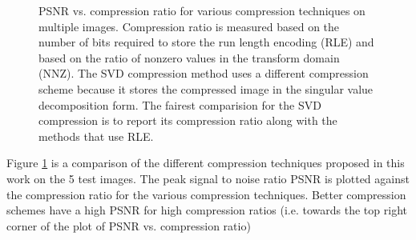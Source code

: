 \documentclass[conference]{IEEEtran}
\begin{document}
\begin{figure}
    \par
    \quad
    \caption{PSNR vs. compression ratio for various compression techniques on multiple images. Compression ratio is measured based on the number of bits required to store the run length encoding (RLE) and based on the ratio of nonzero values in the transform domain (NNZ). The SVD compression method uses a different compression scheme because it stores the compressed image in the singular value decomposition form. The fairest comparision for the SVD compression is to report its compression ratio along with the methods that use RLE.}
    \label{fig:cr_psnr_method_comparison}
\end{figure}

Figure \ref{fig:cr_psnr_method_comparison} is a comparison of the different compression techniques proposed in this work on the 5 test images.
The peak signal to noise ratio PSNR is plotted against the compression ratio for the various compression techniques.
Better compression schemes have a high PSNR for high compression ratios (i.e. towards the top right corner of the plot of PSNR vs. compression ratio)
\end{document}
